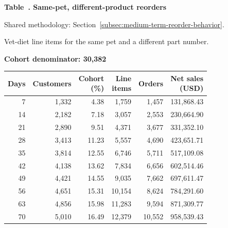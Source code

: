 \label{tab:financial-opportunity-reorder-same-pet-different-part}
\par\smallskip\noindent\parbox[t][2\baselineskip][t]{\linewidth}{\raggedright\textbf{Table~\thetable. Same-pet, different-product reorders}}
\par\raggedright\footnotesize Shared methodology: Section~\ref{subsec:medium-term-reorder-behavior}.
\par\noindent\parbox[t][2\baselineskip][t]{\linewidth}{\raggedright Vet-diet line items for the same pet and a different part number.}
\par\noindent\textbf{Cohort denominator: 30,382}
\par\centering\footnotesize
\setlength{\tabcolsep}{2pt}
\begin{tabular}{rrrrrr}\toprule
Days & Customers & \shortstack{Cohort\\(\%)} & \shortstack{Line\\items} & Orders & \shortstack{Net sales\\(USD)} \\ \midrule

7 & 1,332 & 4.38 & 1,759 & 1,457 & 131,868.43 \\

14 & 2,182 & 7.18 & 3,057 & 2,553 & 230,664.90 \\

21 & 2,890 & 9.51 & 4,371 & 3,677 & 331,352.10 \\

28 & 3,413 & 11.23 & 5,557 & 4,690 & 423,651.71 \\

35 & 3,814 & 12.55 & 6,746 & 5,711 & 517,109.08 \\

42 & 4,138 & 13.62 & 7,834 & 6,656 & 602,514.46 \\

49 & 4,421 & 14.55 & 9,035 & 7,662 & 697,611.47 \\

56 & 4,651 & 15.31 & 10,154 & 8,624 & 784,291.60 \\

63 & 4,856 & 15.98 & 11,283 & 9,594 & 871,309.77 \\

70 & 5,010 & 16.49 & 12,379 & 10,552 & 958,539.43 \\
\bottomrule\end{tabular}\par
